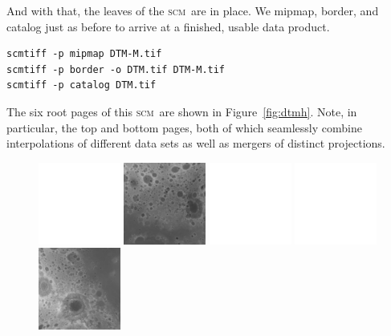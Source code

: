 \documentclass[oneside,10pt]{memoir}
\newcommand{\scm}     {\textsc{scm}}
\begin{document}
\begin{Spacing}{1.1}
And with that, the leaves of the \scm\ are in place. We mipmap, border, and catalog just as before to arrive at a finished, usable data product.

\begin{Verbatim}
scmtiff -p mipmap DTM-M.tif
scmtiff -p border -o DTM.tif DTM-M.tif
scmtiff -p catalog DTM.tif
\end{Verbatim}

The six root pages of this \scm\ are shown in Figure~\ref{fig:dtmh}. Note, in particular, the top and bottom pages, both of which seamlessly combine interpolations of different data sets as well as mergers of distinct projections.

\begin{figure}
  \centering
  \includegraphics[width=0.24\textwidth]{fig/blank.pdf}
  \includegraphics[width=0.24\textwidth]{fig/dtmh2.png}
  \includegraphics[width=0.24\textwidth]{fig/blank.pdf}
  \includegraphics[width=0.24\textwidth]{fig/blank.pdf}\\\vspace{1pt}
  \includegraphics[width=0.24\textwidth]{fig/dtmh1.png}

\end{figure}
\end{Spacing}
\end{document}
